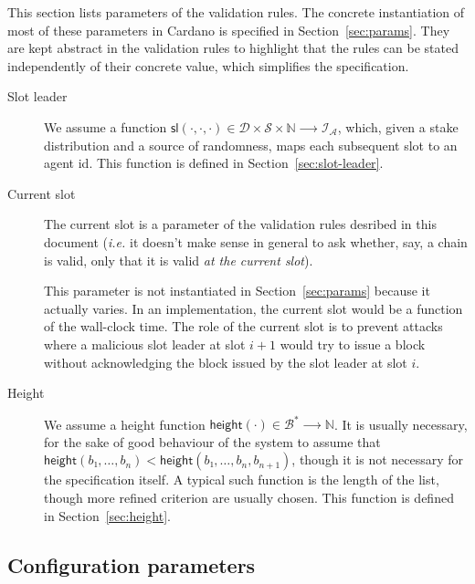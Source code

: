 \documentclass{article}
\newcommand{\lists}[1]{{#1}^*}
\newcommand{\idsof}[1]{\mathcal{I}\!_#1}
\newcommand{\blocks}{\mathcal{B}}
\newcommand{\agentids}{\idsof{\mathcal{A}}}
\newcommand{\slotleader}[3]{\mathsf{sl}(#1,#2,#3)}
\newcommand{\stakedistributions}{\mathcal{D}}
\newcommand{\seeds}{\mathcal{S}}
\newcommand{\height}[1]{\mathsf{height}(#1)}
\begin{document}
This section lists parameters of the validation rules. The concrete
instantiation of most of these parameters in Cardano is specified in
Section~\ref{sec:params}. They are kept abstract in the validation
rules to highlight that the rules can be stated independently of their
concrete value, which simplifies the specification.

\begin{description}
\item[Slot leader] We assume a function
  $\slotleader{⋅}{⋅}{⋅} ∈ \stakedistributions×\seeds×ℕ ⟶ \agentids$,
  which, given a stake distribution and a source of randomness, maps
  each subsequent slot to an agent id. This function is defined in
  Section~\ref{sec:slot-leader}.

\item[Current slot] The current slot is a parameter of the validation
  rules desribed in this document (\emph{i.e.} it doesn't make sense
  in general to ask whether, say, a chain is valid, only that it is
  valid \emph{at the current slot}).

  This parameter is not instantiated in Section~\ref{sec:params}
  because it actually varies. In an implementation, the current slot
  would be a function of the wall-clock time. The role of the current
  slot is to prevent attacks where a malicious slot leader at slot
  $i+1$ would try to issue a block without acknowledging the block
  issued by the slot leader at slot $i$.

\item[Height] We assume a height function
  $\height{⋅} ∈ \lists{\blocks} ⟶ ℕ$. It is usually necessary, for the
  sake of good behaviour of the system to assume that
  $\height{b₁,…,b_n} < \height{b₁,…,b_n,b_{n+1}}$, though it is not
  necessary for the specification itself. A typical such function is
  the length of the list, though more refined criterion are usually
  chosen. This function is defined in Section~\ref{sec:height}.

\end{description}

\subsection{Configuration parameters}
\label{sec:conf-param}
\end{document}
